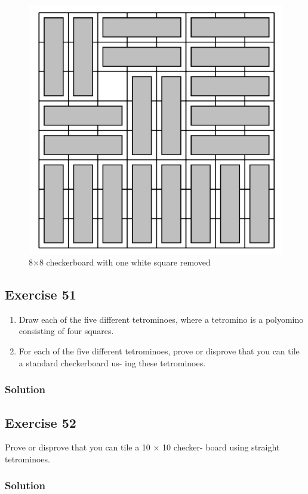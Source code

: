 \documentclass{article}
\begin{document}
\begin{figure}
    \begin{center}
        \includegraphics{8x8CheckerboardTri.png}
        \caption{8$ \times $8 checkerboard with one white square removed}
    \end{center}
\end{figure}
\subsection*{Exercise 51}
\begin{enumerate} [label = (\alph*)]
    \item Draw each of the five different tetrominoes, where a tetromino is a polyomino consisting of four squares.
    \item For each of the five different tetrominoes, prove or disprove that you can tile a standard checkerboard us- ing these tetrominoes.
\end{enumerate}
\subsubsection*{Solution}
\subsection*{Exercise 52}
Prove or disprove that you can tile a 10 × 10 checker- board using straight tetrominoes.
\subsubsection*{Solution}
\end{document}
